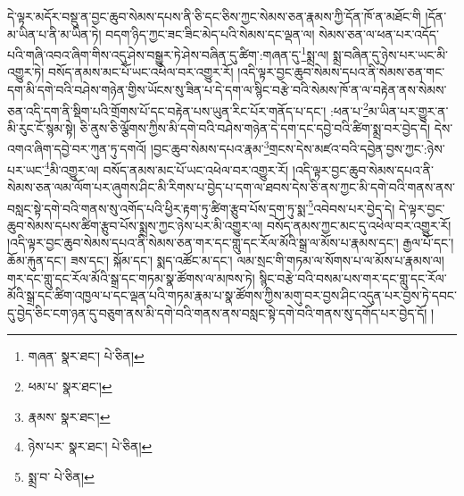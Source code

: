དེ་ལྟར་མདོར་བསྡུ་ན་བྱང་ཆུབ་སེམས་དཔས་ནི་ཅི་དང་ཅིས་ཀྱང་སེམས་ཅན་རྣམས་ཀྱི་དོན་ཁོ་ན་མཐོང་གི །དོན་མ་ཡིན་པ་ནི་མ་ཡིན་ཏེ། བདག་ཉིད་ཀྱང་ཟང་ཟིང་མེད་པའི་སེམས་དང་ལྡན་ལ། སེམས་ཅན་ལ་ཕན་པར་འདོད་པའི་གཞི་འབའ་ཞིག་གིས་འདུ་ཤེས་བསྒྱུར་ཏེ་ཤེས་བཞིན་དུ་ཚིག་:གཞན་དུ་\footnote{གཞན་  སྣར་ཐང་།  པེ་ཅིན། }སྨྲ་ལ། སྨྲ་བཞིན་དུ་ཉེས་པར་ཡང་མི་འགྱུར་ཏེ། བསོད་ནམས་མང་པོ་ཡང་འཕེལ་བར་འགྱུར་རོ། །འདི་ལྟར་བྱང་ཆུབ་སེམས་དཔའ་ནི་སེམས་ཅན་གང་དག་མི་དགེ་བའི་བཤེས་གཉེན་གྱིས་ཡོངས་སུ་ཟིན་པ་དེ་དག་ལ་སྙིང་བརྩེ་བའི་སེམས་ཁོ་ན་ལ་བརྟེན་ནས་སེམས་ཅན་འདི་དག་ནི་སྡིག་པའི་གྲོགས་པོ་དང་བརྟེན་པས་ཡུན་རིང་པོར་གནོད་པ་དང་། :ཕན་པ་\footnote{ཕམ་པ་  སྣར་ཐང་། }མ་ཡིན་པར་གྱུར་ན་མི་རུང་ངོ་སྙམ་སྟེ། ཅི་ནུས་ཅི་ལྕོགས་ཀྱིས་མི་དགེ་བའི་བཤེས་གཉེན་དེ་དག་དང་དབྱེ་བའི་ཚིག་སྨྲ་བར་བྱེད་དེ། དེས་འགའ་ཞིག་དབྱེ་བར་ཀུན་ཏུ་དགའོ། །བྱང་ཆུབ་སེམས་དཔའ་རྣམ་\footnote{རྣམས་  སྣར་ཐང་། }གྲངས་དེས་མཛའ་བའི་དབྱེན་བྱས་ཀྱང་:ཉེས་པར་ཡང་\footnote{ཉེས་པར་  སྣར་ཐང་།  པེ་ཅིན། }མི་འགྱུར་ལ། བསོད་ནམས་མང་པོ་ཡང་འཕེལ་བར་འགྱུར་རོ། །འདི་ལྟར་བྱང་ཆུབ་སེམས་དཔའ་ནི་སེམས་ཅན་ལམ་ལོག་པར་ཞུགས་ཤིང་མི་རིགས་པ་བྱེད་པ་དག་ལ་ཐབས་དེས་ཅི་ནས་ཀྱང་མི་དགེ་བའི་གནས་ནས་བསླང་སྟེ་དགེ་བའི་གནས་སུ་འགོད་པའི་ཕྱིར་རྟག་ཏུ་ཚིག་རྩུབ་པོས་དྲག་ཏུ་སྨ་\footnote{སྨྲ་བ་  པེ་ཅིན། }འབེབས་པར་བྱེད་དེ། དེ་ལྟར་བྱང་ཆུབ་སེམས་དཔས་ཚིག་རྩུབ་པོས་སྨྲས་ཀྱང་ཉེས་པར་མི་འགྱུར་ལ། བསོད་ནམས་ཀྱང་མང་དུ་འཕེལ་བར་འགྱུར་རོ། །འདི་ལྟར་བྱང་ཆུབ་སེམས་དཔའ་ནི་སེམས་ཅན་གར་དང་གླུ་དང་རོལ་མོའི་སྒྲ་ལ་མོས་པ་རྣམས་དང་། རྒྱལ་པོ་དང་། ཆོམ་རྐུན་དང་། ཟས་དང་། སྐོམ་དང་། སྨད་འཚོང་མ་དང་། ལམ་སྲང་གི་གཏམ་ལ་སོགས་པ་ལ་མོས་པ་རྣམས་ལ། གར་དང་གླུ་དང་རོལ་མོའི་སྒྲ་དང་གཏམ་སྣ་ཚོགས་ལ་མཁས་ཏེ། སྙིང་བརྩེ་བའི་བསམ་པས་གར་དང་གླུ་དང་རོལ་མོའི་སྒྲ་དང་ཚིག་འཁྱལ་པ་དང་ལྡན་པའི་གཏམ་རྣམ་པ་སྣ་ཚོགས་ཀྱིས་མགུ་བར་བྱས་ཤིང་འདུན་པར་བྱས་ཏེ་དབང་དུ་བྱེད་ཅིང་ངག་ཉན་དུ་བཅུག་ནས་མི་དགེ་བའི་གནས་ནས་བསླང་སྟེ་དགེ་བའི་གནས་སུ་དགོད་པར་བྱེད་དོ། །
